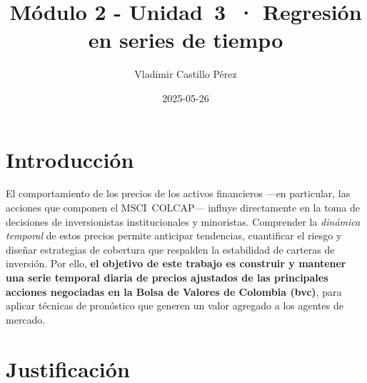 \documentclass[
  11pt,
]{book}
\title{Módulo 2 - Unidad~3~· Regresión en series de tiempo}
\author{Vladimir Castillo Pérez}
\date{2025-05-26}
\begin{document}
\maketitle

{
\setcounter{tocdepth}{1}
\tableofcontents
}
\chapter{Introducción}\label{introducciuxf3n}

El comportamiento de los precios de los activos financieros ---en particular, las acciones que componen el MSCI~COLCAP--- influye directamente en la toma de decisiones de inversionistas institucionales y minoristas. Comprender la \emph{dinámica temporal} de estos precios permite anticipar tendencias, cuantificar el riesgo y diseñar estrategias de cobertura que respalden la estabilidad de carteras de inversión. Por ello, \textbf{el objetivo de este trabajo es construir y mantener una serie temporal diaria de precios ajustados de las principales acciones negociadas en la Bolsa de Valores de Colombia (bvc)}, para aplicar técnicas de pronóstico que generen un valor agregado a los agentes de mercado.

\chapter{Justificación}\label{justificaciuxf3n}
\end{document}
